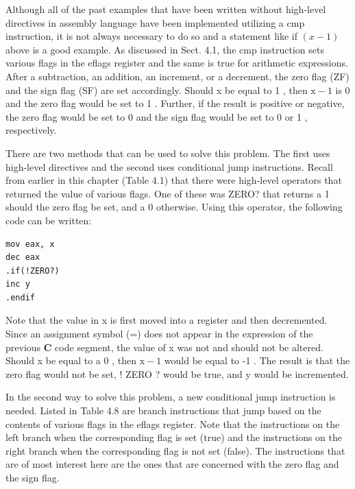 \documentclass[10pt]{book}
\begin{document}
Although all of the past examples that have been written without high-level directives in assembly language have been implemented utilizing a cmp instruction, it is not always necessary to do so and a statement like if $(x-1)$ above is a good example. As discussed in Sect. 4.1, the cmp instruction sets various flags in the eflags register and the same is true for arithmetic expressions. After a subtraction, an addition, an increment, or a decrement, the zero flag (ZF) and the sign flag (SF) are set accordingly. Should x be equal to 1 , then $\mathrm{x}-1$ is 0 and the zero flag would be set to 1 . Further, if the result is positive or negative, the zero flag would be set to 0 and the sign flag would be set to 0 or 1 , respectively.

There are two methods that can be used to solve this problem. The first uses high-level directives and the second uses conditional jump instructions. Recall from earlier in this chapter (Table 4.1) that there were high-level operators that returned the value of various flags. One of these was ZERO? that returns a 1 should the zero flag be set, and a 0 otherwise. Using this operator, the following code can be written:

\begin{verbatim}
mov eax, x
dec eax
.if(!ZERO?)
inc y
.endif
\end{verbatim}

Note that the value in x is first moved into a register and then decremented. Since an assignment symbol (=) does not appear in the expression of the previous $\mathbf{C}$ code segment, the value of x was not and should not be altered. Should x be equal to a 0 , then $\mathrm{x}-1$ would be equal to -1 . The result is that the zero flag would not be set, ! ZERO ? would be true, and y would be incremented.

In the second way to solve this problem, a new conditional jump instruction is needed. Listed in Table 4.8 are branch instructions that jump based on the contents of various flags in the eflags register. Note that the instructions on the left branch when the corresponding flag is set (true) and the instructions on the right branch when the corresponding flag is not set (false). The instructions that are of most interest here are the ones that are concerned with the zero flag and the sign flag.
\end{document}
